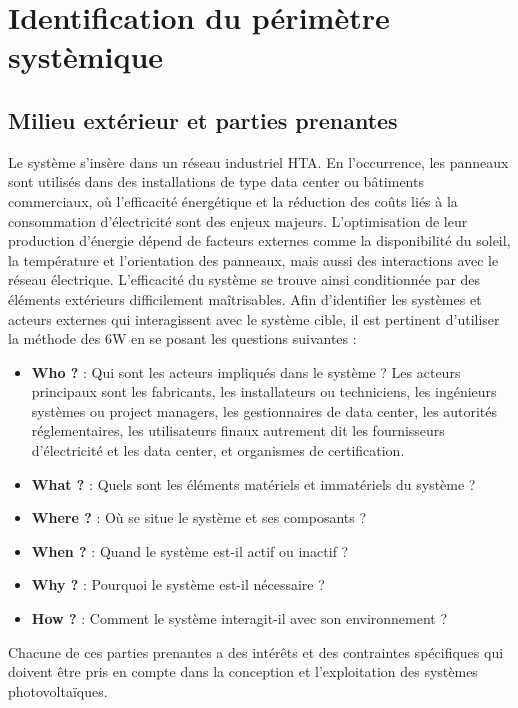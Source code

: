 \documentclass{article}
\begin{document}
\section{Identification du périmètre systèmique}


\subsection{Milieu extérieur et parties prenantes}
Le système s'insère dans un réseau industriel HTA. En l'occurrence, les panneaux sont utilisés dans des installations de type data center ou bâtiments commerciaux, où l'efficacité énergétique et la réduction des coûts liés à la consommation d'électricité sont des enjeux majeurs. L’optimisation de leur production d’énergie dépend de facteurs externes comme la disponibilité du soleil, la température et l'orientation des panneaux, mais aussi des interactions avec le réseau électrique. L’efficacité du système se trouve ainsi conditionnée par des éléments extérieurs difficilement maîtrisables. 
Afin d'identifier les systèmes et acteurs externes qui interagissent avec le système cible, il est pertinent d'utiliser la méthode des 6W en se posant les questions suivantes :
\begin{itemize}
    \item \textbf{Who ?} : Qui sont les acteurs impliqués dans le système ?
    Les acteurs principaux sont les fabricants, les installateurs ou techniciens, les ingénieurs systèmes ou project managers, les gestionnaires de data center, les autorités réglementaires, les utilisateurs finaux autrement dit les fournisseurs d'électricité et les data center, et organismes de certification.
    \item \textbf{What ?} : Quels sont les éléments matériels et immatériels du système ?
    \item \textbf{Where ?} : Où se situe le système et ses composants ?
    \item \textbf{When ?} : Quand le système est-il actif ou inactif ?
    \item \textbf{Why ?} : Pourquoi le système est-il nécessaire ?
    \item \textbf{How ?} : Comment le système interagit-il avec son environnement ?
\end {itemize}



Chacune de ces parties prenantes a des intérêts et des contraintes spécifiques qui doivent être pris en compte dans la conception et l'exploitation des systèmes photovoltaïques.
\end{document}
